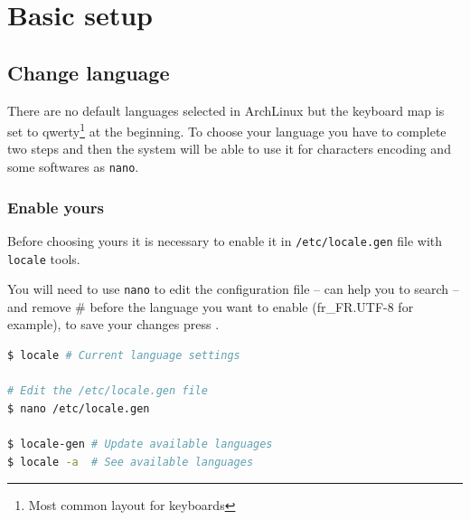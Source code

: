 \chapter{Basic setup}
\section{Change language}
There are no default languages selected in ArchLinux but the keyboard map is set to 
qwerty\footnote{Most common layout for keyboards} at the beginning. To choose 
your language you have to complete two steps and then the system will be able to 
use it for characters encoding and some softwares as \texttt{nano}.

\subsection{Enable yours}
Before choosing yours it is necessary to enable it in \texttt{/etc/locale.gen}
file with \texttt{locale} tools. 

You will need to use \texttt{nano} to edit the configuration file --  can help you to search -- and remove \og\#\fg{} before the language you want 
to enable (fr\_FR.UTF-8 for example), to save your changes press .
\\
\begin{lstlisting}[language=bash,caption=Enable your language]
$ locale # Current language settings

# Edit the /etc/locale.gen file
$ nano /etc/locale.gen

$ locale-gen # Update available languages
$ locale -a  # See available languages
\end{lstlisting}

